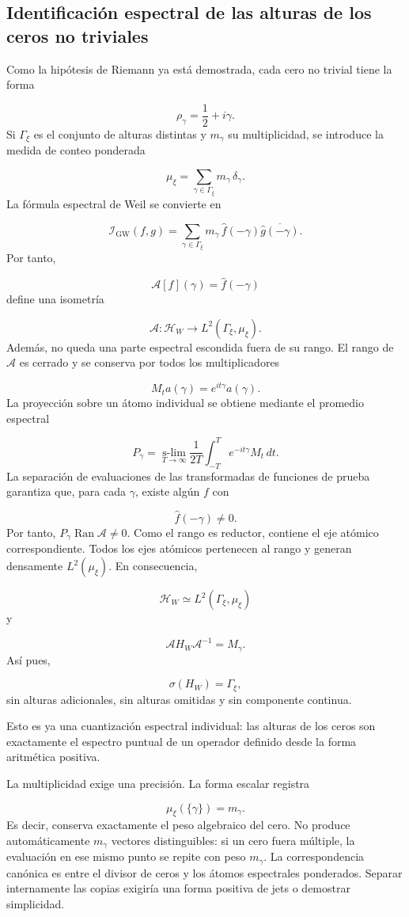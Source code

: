 \subsection{Identificación espectral de las alturas de los ceros no triviales}
Como la hipótesis de Riemann ya está demostrada, cada cero no trivial tiene la forma\par
\[
\rho_\gamma=\frac12+i\gamma.
\]
Si \(\Gamma_\xi\) es el conjunto de alturas distintas y \(m_\gamma\) su multiplicidad, se introduce la medida de conteo ponderada\par
\[
\mu_\xi
=
\sum_{\gamma\in\Gamma_\xi}
m_\gamma\,\delta_\gamma.
\]
La fórmula espectral de Weil se convierte en\par
\[
\mathscr I_{\mathrm{GW}}(f,g)
=
\sum_{\gamma\in\Gamma_\xi}
m_\gamma\,
\widehat f(-\gamma)
\overline{\widehat g(-\gamma)}.
\]
Por tanto,\par
\[
\mathcal A[f](\gamma)
=
\widehat f(-\gamma)
\]
define una isometría\par
\[
\mathcal A:
\mathcal H_W
\longrightarrow
L^2(\Gamma_\xi,\mu_\xi).
\]
Además, no queda una parte espectral escondida fuera de su rango. El rango de \(\mathcal A\) es cerrado y se conserva por todos los multiplicadores\par
\[
M_t a(\gamma)=e^{it\gamma}a(\gamma).
\]
La proyección sobre un átomo individual se obtiene mediante el promedio espectral\par
\[
P_\gamma
=
\operatorname*{s-lim}_{T\to\infty}
\frac1{2T}
\int_{-T}^{T}
e^{-it\gamma}M_t\,dt.
\]
La separación de evaluaciones de las transformadas de funciones de prueba garantiza que, para cada \(\gamma\), existe algún \(f\) con\par
\[
\widehat f(-\gamma)\neq0.
\]
Por tanto, \(P_\gamma\operatorname{Ran}\mathcal A\neq0\). Como el rango es reductor, contiene el eje atómico correspondiente. Todos los ejes atómicos pertenecen al rango y generan densamente \(L^2(\mu_\xi)\). En consecuencia,\par
\[
\boxed{
\mathcal H_W
\simeq
L^2(\Gamma_\xi,\mu_\xi)
}
\]
y\par
\[
\boxed{
\mathcal A H_W\mathcal A^{-1}
=
M_\gamma.
}
\]
Así pues,\par
\[
\boxed{
\sigma(H_W)=\Gamma_\xi,
}
\]
sin alturas adicionales, sin alturas omitidas y sin componente continua.\par
Esto es ya una cuantización espectral individual: las alturas de los ceros son exactamente el espectro puntual de un operador definido desde la forma aritmética positiva.\par
La multiplicidad exige una precisión. La forma escalar registra\par
\[
\mu_\xi(\{\gamma\})=m_\gamma.
\]
Es decir, conserva exactamente el peso algebraico del cero. No produce automáticamente \(m_\gamma\) vectores distinguibles: si un cero fuera múltiple, la evaluación en ese mismo punto se repite con peso \(m_\gamma\). La correspondencia canónica es entre el divisor de ceros y los átomos espectrales ponderados. Separar internamente las copias exigiría una forma positiva de jets o demostrar simplicidad.\par
{}
